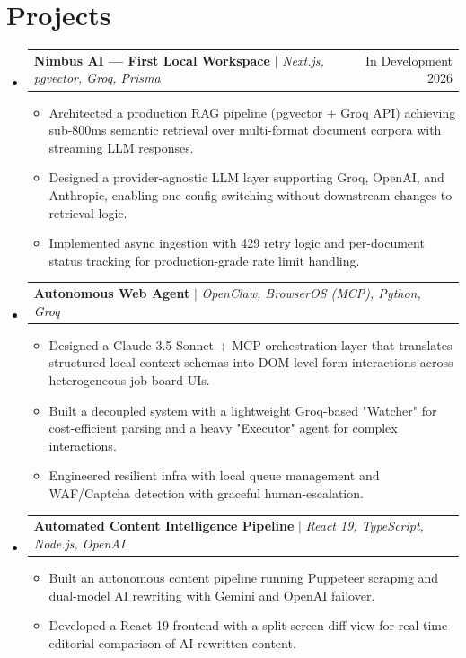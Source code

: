 \documentclass[a4paper,10pt]{article}
\makeatletter
\newcommand{\resumeItem}[1]{
  \item\small{
    {#1 \vspace{-2pt}}
  }
}
\newcommand{\resumeProjectHeading}[2]{
    \item
    \begin{tabular*}{\textwidth}{l@{\extracolsep{\fill}}r}
      \small#1 & #2 \\
    \end{tabular*}\vspace{-7pt}
}
\newcommand{\resumeSubHeadingListStart}{\begin{itemize}[leftmargin=0.15in, label={}]}
\newcommand{\resumeSubHeadingListEnd}{\end{itemize}}
\newcommand{\resumeItemListStart}{\begin{itemize}}
\newcommand{\resumeItemListEnd}{\end{itemize}\vspace{-5pt}}
\makeatother
\begin{document}
\section{Projects}
    \resumeSubHeadingListStart
      \resumeProjectHeading
          {\textbf{Nimbus AI — First Local Workspace} $|$ \emph{Next.js, pgvector, Groq, Prisma}}{In Development 2026}
          \resumeItemListStart
            \resumeItem{Architected a production RAG pipeline (pgvector + Groq API) achieving sub-800ms semantic retrieval over multi-format document corpora with streaming LLM responses.}
            \resumeItem{Designed a provider-agnostic LLM layer supporting Groq, OpenAI, and Anthropic, enabling one-config switching without downstream changes to retrieval logic.}
            \resumeItem{Implemented async ingestion with 429 retry logic and per-document status tracking for production-grade rate limit handling.}
          \resumeItemListEnd
          
      \resumeProjectHeading
          {\textbf{Autonomous Web Agent} $|$ \emph{OpenClaw, BrowserOS (MCP), Python, Groq}}{}
          \resumeItemListStart
            \resumeItem{Designed a Claude 3.5 Sonnet + MCP orchestration layer that translates structured local context schemas into DOM-level form interactions across heterogeneous job board UIs.}
            \resumeItem{Built a decoupled system with a lightweight Groq-based "Watcher" for cost-efficient parsing and a heavy "Executor" agent for complex interactions.}
            \resumeItem{Engineered resilient infra with local queue management and WAF/Captcha detection with graceful human-escalation.}
          \resumeItemListEnd

      \resumeProjectHeading
          {\textbf{Automated Content Intelligence Pipeline} $|$ \emph{React 19, TypeScript, Node.js, OpenAI}}{}
          \resumeItemListStart
            \resumeItem{Built an autonomous content pipeline running Puppeteer scraping and dual-model AI rewriting with Gemini and OpenAI failover.}
            \resumeItem{Developed a React 19 frontend with a split-screen diff view for real-time editorial comparison of AI-rewritten content.}
          \resumeItemListEnd
    \resumeSubHeadingListEnd

\end{document}

